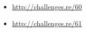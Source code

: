 \sectionold{\Exercises}

\begin{itemize}
	\item \url{http://challenges.re/60}
	\item \url{http://challenges.re/61}
\end{itemize}

